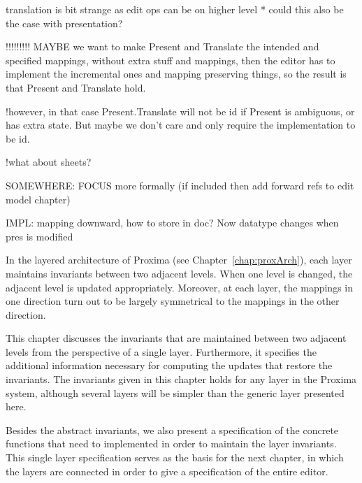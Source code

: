 translation is bit strange as edit ops can be on higher level
* could this also be the case with presentation?



!!!!!!!!!
MAYBE we want to make Present and Translate the intended and specified mappings, 
without extra stuff and mappings, then the editor has to implement the incremental ones
 and mapping preserving things, so the result is that Present and Translate hold.

!however, in that case Present.Translate will not be id if Present is ambiguous, or 
has extra state. But maybe we don't care and only require the implementation to be id.

!what about sheets? 

SOMEWHERE: FOCUS more formally (if included then add forward refs to edit model chapter)


IMPL: mapping downward, how to store in doc? Now datatype changes when pres is modified

\ec



In the layered architecture of Proxima (see Chapter~\ref{chap:proxArch}), each layer maintains invariants between two adjacent levels. When one level is changed, the adjacent level is updated appropriately. Moreover, at each layer, the mappings in one direction turn out to be largely symmetrical to the mappings in the other direction.

This chapter discusses the invariants that are maintained between two adjacent levels from the perspective of a single layer. Furthermore, it specifies the additional information necessary for computing the updates that restore the invariants. The invariants given in this chapter holds for any layer in the Proxima system, although several layers will be simpler than the generic layer presented here.

Besides the abstract invariants, we also present a specification of the concrete functions that need to implemented in order to maintain the layer invariants. This single layer specification serves as the basis for the next chapter, in which the layers are connected in order to give a specification of the entire editor.




